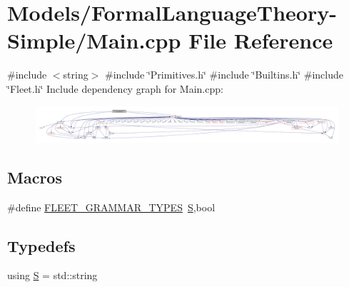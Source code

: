 \hypertarget{_formal_language_theory-_simple_2_main_8cpp}{}\section{Models/\+Formal\+Language\+Theory-\/\+Simple/\+Main.cpp File Reference}
\label{_formal_language_theory-_simple_2_main_8cpp}
{\ttfamily \#include $<$string$>$}\newline
{\ttfamily \#include \char`\"{}Primitives.\+h\char`\"{}}\newline
{\ttfamily \#include \char`\"{}Builtins.\+h\char`\"{}}\newline
{\ttfamily \#include \char`\"{}Fleet.\+h\char`\"{}}\newline
Include dependency graph for Main.\+cpp\+:
\nopagebreak
\begin{figure}[H]
\begin{center}
\leavevmode
\includegraphics[width=350pt]{_formal_language_theory-_simple_2_main_8cpp__incl}
\end{center}
\end{figure}
\subsection*{Macros}
\begin{DoxyCompactItemize}
\item 
\#define \hyperlink{_formal_language_theory-_simple_2_main_8cpp_a89fb8e7826ca09e23da0ce4b39ee03c0}{F\+L\+E\+E\+T\+\_\+\+G\+R\+A\+M\+M\+A\+R\+\_\+\+T\+Y\+P\+ES}~\hyperlink{_formal_language_theory-_complex_2_main_8cpp_a51c40915539205f0b5add30b0d68a4cb}{S},bool
\end{DoxyCompactItemize}
\subsection*{Typedefs}
\begin{DoxyCompactItemize}
\item 
using \hyperlink{_formal_language_theory-_simple_2_main_8cpp_a51c40915539205f0b5add30b0d68a4cb}{S} = std\+::string
\end{DoxyCompactItemize}


